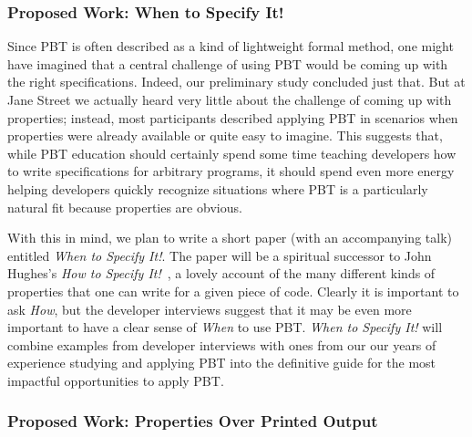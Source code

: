 \subsubsection{Proposed Work: When to Specify It!}
Since PBT is often described as a kind of lightweight formal method, one might
have imagined that a central challenge of using PBT would be coming up with the
right specifications. Indeed, our preliminary study concluded just that. But at
Jane Street we actually heard very little about the challenge of coming up with
properties; instead, most participants described applying PBT in scenarios when
properties were already available or quite easy to imagine. This suggests that,
while PBT education should certainly spend some time teaching developers how to
write specifications for arbitrary programs, it should spend even more energy
helping developers quickly recognize  situations where PBT is a particularly
natural fit because properties are obvious.

With this in mind, we plan to write a short paper (with an accompanying talk)
entitled {\em When to Specify It!}. The paper will be a spiritual successor to
John Hughes's {\em How to Specify It!}~\cite{HowToSpecifyIt}, a lovely account
of the many different kinds of properties that one can write for a given piece
of code. Clearly it is important to ask {\em How}, but the developer interviews
suggest that it may be even more important to have a clear sense of {\em When}
to use PBT. {\em When to Specify It!} will combine examples from developer
interviews with ones from our our years of experience studying and applying PBT
into the definitive guide for the most impactful opportunities to apply PBT.

\subsubsection{Proposed Work: Properties Over Printed Output}

